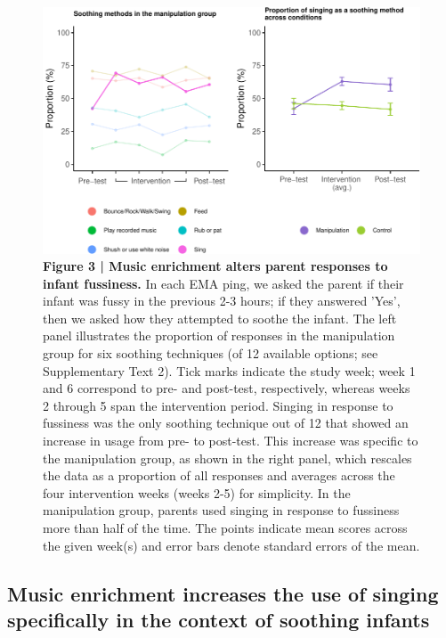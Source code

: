 \documentclass[
]{article}
\begin{document}
\begin{figure}[H]

{\centering \includegraphics{MIPH_childdev_files/figure-latex/figure-3AB-1} 

}

\caption{\textbf{Figure 3 | Music enrichment alters parent responses to infant fussiness.} In each EMA ping, we asked the parent if their infant was fussy in the previous 2-3 hours; if they answered 'Yes', then we asked how they attempted to soothe the infant. The left panel illustrates the proportion of responses in the manipulation group for six soothing techniques (of 12 available options; see Supplementary Text 2). Tick marks indicate the study week; week 1 and 6 correspond to pre- and post-test, respectively, whereas weeks 2 through 5 span the intervention period. Singing in response to fussiness was the only soothing technique out of 12 that showed an increase in usage from pre- to post-test. This increase was specific to the manipulation group, as shown in the right panel, which rescales the data as a proportion of all responses and averages across the four intervention weeks (weeks 2-5) for simplicity. In the manipulation group, parents used singing in response to fussiness more than half of the time. The points indicate mean scores across the given week(s) and error bars denote standard errors of the mean.}\label{fig:figure-3AB}
\end{figure}

\subsection{Music enrichment increases the use of singing specifically
in the context of soothing
infants}\label{music-enrichment-increases-the-use-of-singing-specifically-in-the-context-of-soothing-infants}
\end{document}
